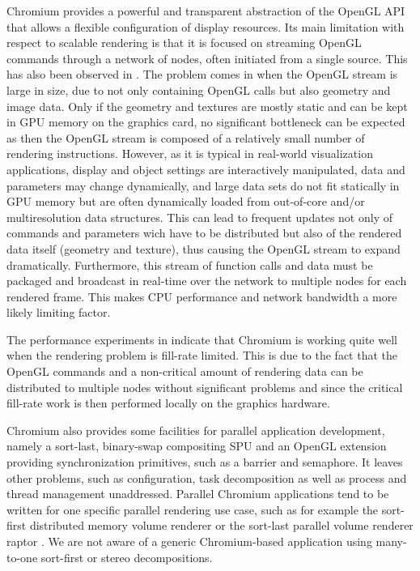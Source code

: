 Chromium \cite{HHNFAKK:02} provides a powerful and transparent abstraction of
the OpenGL API that allows a flexible configuration of display resources. Its
main limitation with respect to scalable rendering is that it is focused on
streaming OpenGL commands through a network of nodes, often initiated from a
single source. This has also been observed in \cite{SWNH:03}. The problem comes
in when the OpenGL stream is large in size, due to not only containing OpenGL
calls but also geometry and image data. Only if the geometry and textures are
mostly static and can be kept in GPU memory on the graphics card, no
significant bottleneck can be expected as then the OpenGL stream is composed of
a relatively small number of rendering instructions. However, as it is typical
in real-world visualization applications, display and object settings are
interactively manipulated, data and parameters may change dynamically, and
large data sets do not fit statically in GPU memory but are often dynamically
loaded from out-of-core and/or multiresolution data structures. This can lead
to frequent updates not only of commands and parameters wich have to be
distributed but also of the rendered data itself (geometry and texture), thus
causing the OpenGL stream to expand dramatically. Furthermore, this stream of
function calls and data must be packaged and broadcast in real-time over the
network to multiple nodes for each rendered frame. This makes CPU performance
and network bandwidth a more likely limiting factor.

The performance experiments in \cite{HHNFAKK:02} indicate that Chromium is
working quite well when the rendering problem is fill-rate limited. This is due
to the fact that the OpenGL commands and a non-critical amount of rendering data
can be distributed to multiple nodes without significant problems and since the
critical fill-rate work is then performed locally on the graphics hardware.

Chromium also provides some facilities for parallel application development,
namely a sort-last, binary-swap compositing SPU and an OpenGL extension
providing synchronization primitives, such as a barrier and semaphore. It leaves
other problems, such as configuration, task decomposition as well as process and
thread management unaddressed. Parallel Chromium applications tend to be written
for one specific parallel rendering use case, such as for example the sort-first
distributed memory volume renderer \cite{BHPB:03} or the sort-last parallel
volume renderer raptor \cite{Raptor}. We are not aware of a generic
Chromium-based application using many-to-one sort-first or stereo
decompositions.

